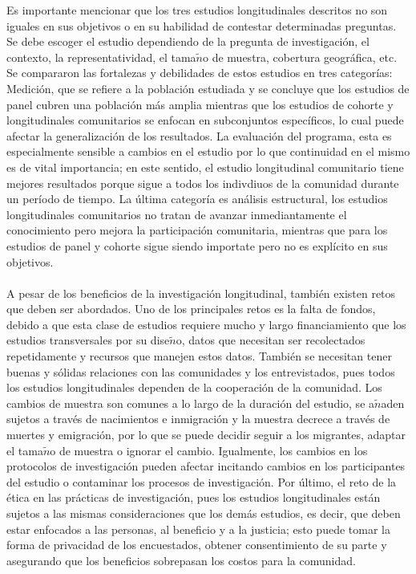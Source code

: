\documentclass[10pt,spanish,letterpaper]{article}
\theoremstyle{plain}
\begin{document}
Es importante mencionar que los tres estudios longitudinales descritos no son iguales en sus objetivos o en su habilidad de contestar determinadas preguntas. Se debe escoger el estudio dependiendo de la pregunta de investigaci\'on, el contexto, la representatividad, el tama$\tilde{n}$o de muestra, cobertura geogr\'afica, etc. Se compararon las fortalezas y debilidades de estos estudios en tres categor\'ias: Medici\'on, que se refiere a la poblaci\'on estudiada y se concluye que los estudios de panel cubren una poblaci\'on m\'as amplia mientras que los estudios de cohorte y longitudinales comunitarios se enfocan en subconjuntos espec\'ificos, lo cual puede afectar la generalizaci\'on de los resultados. La evaluaci\'on del programa, esta es especialmente sensible a cambios en el estudio por lo que continuidad en el mismo es de vital importancia; en este sentido, el estudio longitudinal comunitario tiene mejores resultados porque sigue a todos los indivdiuos de la comunidad durante un per\'iodo de tiempo. La \'ultima categor\'ia es an\'alisis estructural, los estudios longitudinales comunitarios no tratan de avanzar inmediantamente el conocimiento pero mejora la participaci\'on comunitaria, mientras que para los estudios de panel y cohorte sigue siendo importate pero no es expl\'icito en sus objetivos.\\
\\
A pesar de los beneficios de la investigaci\'on longitudinal, tambi\'en existen retos que deben ser abordados. Uno de los principales retos es la falta de fondos, debido a que esta clase de estudios requiere mucho y largo financiamiento que los estudios transversales por su dise$\tilde{n}$o, datos que necesitan ser recolectados repetidamente y recursos que manejen estos datos. Tambi\'en se necesitan tener buenas y s\'olidas relaciones con las comunidades y los entrevistados, pues todos los estudios longitudinales dependen de la cooperaci\'on de la comunidad. Los cambios de muestra son comunes a lo largo de la duraci\'on del estudio, se a$\tilde{n}$aden sujetos a trav\'es de nacimientos e inmigraci\'on y la muestra decrece a trav\'es de muertes y emigraci\'on, por lo que se puede decidir seguir a los migrantes, adaptar el tama$\tilde{n}$o de muestra o ignorar el cambio. Igualmente, los cambios en los protocolos de investigaci\'on pueden afectar incitando cambios en los participantes del estudio o contaminar los procesos de investigaci\'on. Por \'ultimo, el reto de la \'etica en las pr\'acticas de investigaci\'on, pues los estudios longitudinales est\'an sujetos a las mismas consideraciones que los dem\'as estudios, es decir, que deben estar enfocados a las personas, al beneficio y a la justicia; esto puede tomar la forma de privacidad de los encuestados, obtener consentimiento de su parte y asegurando que los beneficios sobrepasan los costos para la comunidad.\\
\end{document}
